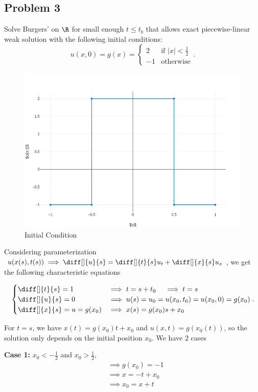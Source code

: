 \subsection{Problem 3}%

Solve Burgers' on $\R$ for small enough $t\leq t_{b}$ that allows exact
piecewise-linear weak solution with the following initial conditions:
\[
  u(x,0) = g(x) = \begin{cases}
    2 & \text{if $|x| < \frac{1}{2}$} \\
    -1 & \text{otherwise}
  \end{cases}
.\] 

\graphicspath{{./assignment_01/figures/}}

\begin{figure}[H]
  \centering
  \includegraphics[width=0.8\linewidth]{init_cond.png}
  \caption{Initial Condition}%
\end{figure}

Considering parameterization $u(x(s), t(s)) \implies \diff[]{u}{s}
= \diff[]{t}{s}u_{t} + \diff[]{x}{s}u_{x}$, we get the following characteristic
equations

\[
\begin{cases}
  \diff[]{t}{s} = 1 & \implies t = s+t_0  \quad\implies t = s \\
  \diff[]{u}{s} = 0 & \implies u(s) = u_0 = u(x_0,t_0) = u(x_0,0) = g(x_0) \\
  \diff[]{x}{s} = u = g(x_0) & \implies x(s) = g(x_0)s + x_0
\end{cases}
.\] 

For $t=s$, we have $x(t) = g(x_0)t+x_0$ and $u(x,t) = g(x_0(t))$, so the
solution only depends on the initial position $x_0$. We have $2$ cases

\textbf{Case 1:} $x_0 < -\frac{1}{2}$ and $x_0 > \frac{1}{2}$,
\begin{align*}
  &\implies g(x_0) = -1 \\
  &\implies x = -t + x_0 \\
  &\implies x_0 = x + t
\end{align*}

